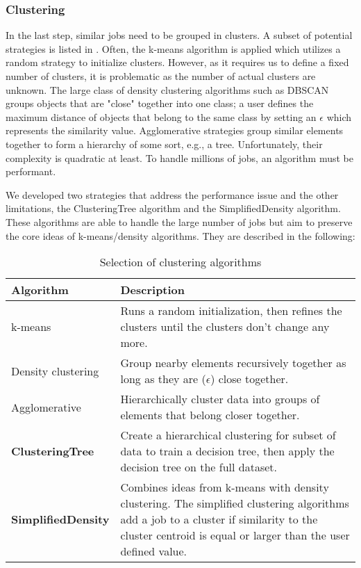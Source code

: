 \documentclass{jhps}
\begin{document}
\subsubsection{Clustering}
In the last step, similar jobs need to be grouped in clusters.
A subset of potential strategies is listed in .
Often, the k-means algorithm is applied which utilizes a random strategy to initialize clusters.
However, as it requires us to define a fixed number of clusters, it is problematic as the number of actual clusters are unknown.
The large class of density clustering algorithms such as DBSCAN groups objects that are "close" together into one class; a user defines the maximum distance of objects that belong to the same class by setting an $\epsilon$ which represents the similarity value.
Agglomerative strategies group similar elements together to form a hierarchy of some sort, e.g., a tree.
Unfortunately, their complexity is quadratic at least.
To handle millions of jobs, an algorithm must be performant.

We developed two strategies that address the performance issue and the other limitations, the ClusteringTree algorithm and the SimplifiedDensity algorithm.
These algorithms are able to handle the large number of jobs but aim to preserve the core ideas of k-means/density algorithms.
They are described in the following:

\begin{table}
  \centering
  \begin{tabularx}{\textwidth}{lX}
    Algorithm & Description \\
    \hline
    k-means & Runs a random initialization, then refines the clusters until the clusters don't change any more.\\
    \hline
    Density clustering &  Group nearby elements recursively together as long as they are ($\epsilon$) close together.\\
    \hline
    Agglomerative &  Hierarchically cluster data into groups of elements that belong closer together.\\
    \hline
    \textbf{ClusteringTree} &  Create a hierarchical clustering for subset of data to train a decision tree, then apply the decision tree on the full dataset.\\
    \hline
    \textbf{SimplifiedDensity} &  Combines ideas from k-means with density clustering.
The simplified clustering algorithms add a job to a cluster if similarity to the cluster centroid is equal or larger than the user defined value.\\
    \hline
  \end{tabularx}
  \caption{Selection of clustering algorithms}
  \label{tab:clustering_algorithms}
\end{table}
\end{document}
